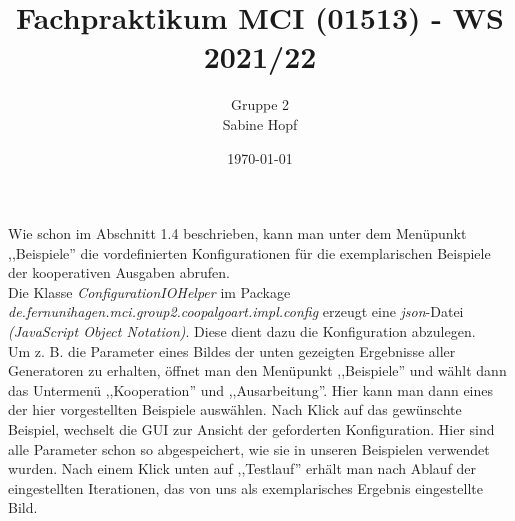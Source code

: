 \documentclass[../mciAusarbeitung.tex]{subfiles}
\title{Fachpraktikum MCI (01513) - WS 2021/22}
\author{Gruppe 2\\
	Sabine Hopf}
\date{\today}
\begin{document}
	Wie schon im Abschnitt 1.4 beschrieben, kann man unter dem Menüpunkt ,,Beispiele'' die vordefinierten Konfigurationen für die exemplarischen Beispiele der kooperativen Ausgaben abrufen.\\
	Die Klasse \textit{ConfigurationIOHelper} im Package \textit{de.fernunihagen.mci.group2.coopalgoart.impl.config} erzeugt eine \textit{json}-Datei \textit{(JavaScript Object Notation)}. Diese dient dazu die Konfiguration abzulegen.\\
	Um z. B. die Parameter eines Bildes der unten gezeigten Ergebnisse aller Generatoren zu erhalten, öffnet man den Menüpunkt ,,Beispiele'' und wählt dann das Untermenü ,,Kooperation'' und ,,Ausarbeitung''. Hier kann man dann eines der hier vorgestellten Beispiele auswählen. Nach Klick auf das gewünschte Beispiel, wechselt die GUI zur Ansicht der geforderten Konfiguration. Hier sind alle Parameter schon so abgespeichert, wie sie in unseren Beispielen verwendet wurden. Nach einem Klick unten auf ,,Testlauf'' erhält man nach Ablauf der eingestellten Iterationen, das von uns als exemplarisches Ergebnis eingestellte Bild.
\end{document}
